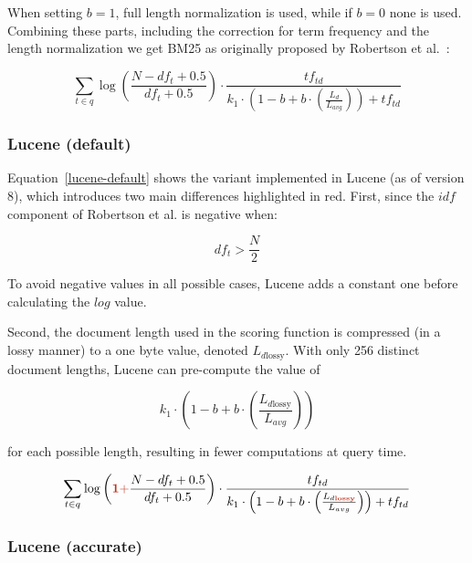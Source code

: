 When setting $b=1$, full length normalization is used, while if $b=0$ none is used. Combining these parts, including the correction for term frequency and the length normalization we get BM25 as originally proposed by Robertson et al.~\cite{bm25-robertson}:

\begin{equation}
	\label{bm25-robertson}
	\sum_{t\in q} \log\left(\frac{N-df_t+0.5}{df_t+0.5}\right)\cdot\frac{tf_{td}}{k_1\cdot\left(1-b+b\cdot\left(\frac{L_d}{L_{avg}}\right)\right) + tf_{td}}
\end{equation}

\subsubsection{Lucene (default)}
Equation~\ref{lucene-default} shows the variant implemented in Lucene (as of version 8), which introduces two main differences highlighted in red. First, since the $idf$ component of Robertson et al. is negative when:

\begin{equation}
	df_t > \frac{N}{2} 
\end{equation}

To avoid negative values in all possible cases, Lucene adds a constant one before calculating the $log$ value. 

Second, the document length used in the scoring function is compressed (in a lossy manner) to a one byte value, denoted $L_{d\text{lossy}}$. With only 256 distinct document lengths, Lucene can pre-compute the value of

\begin{equation}
	k_1 \cdot \left(1-b+b\cdot\left(\frac{L_{d\text{lossy}}}{L_{avg}}\right)\right)
\end{equation}

for each possible length, resulting in fewer computations at query time.

\begin{equation}
	\label{lucene-default}
	\sum_{t\in q}\log\left(\mathbf{\begingroup\color{ruhuisstijlrood}1 +\endgroup} \frac{N-df_t+0.5}{df_t+0.5}\right)\cdot\frac{tf_{td}}{k_1\cdot\left(1-b+b\cdot\left(\frac{L_{d \mathbf{\begingroup\color{ruhuisstijlrood}lossy\endgroup}}}{L_{avg}}\right)\right)+tf_{td}}
\end{equation}

\subsubsection{Lucene (accurate)}

